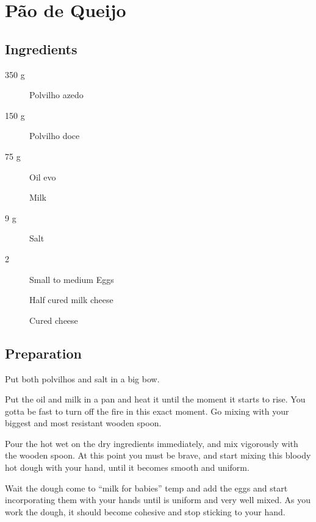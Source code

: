 \setchapterpreamble[u]{\margintoc}
\chapter{Pão de Queijo}

\section{Ingredients}

\begin{multicols}{2}
\begin{description}
	\item[350 g] Polvilho azedo
	\item[150 g] Polvilho doce
	\item[75 g] Oil \gls{evo}
	\item[] Milk
	\item[9 g] Salt
	\item[2 ] Small to medium Eggs
	\item[] Half cured milk cheese
	\item[] Cured cheese
\end{description}
\end{multicols}

\section{Preparation}
Put both polvilhos and salt in a big bow.

Put the oil and milk in a pan and heat it until the moment it starts to rise. You gotta be fast to turn off the fire in this exact moment. 
%
Go mixing with your biggest and most resistant wooden spoon.

Pour the hot wet on the dry ingredients immediately, and mix vigorously with the wooden spoon.
%
At this point you must be brave, and start mixing this bloody hot dough with your hand, until it becomes smooth and uniform.

Wait the dough come to ``milk for babies'' temp and add the eggs and start incorporating them with your hands until is uniform and very well mixed.
%
As you work the dough, it should become cohesive and stop sticking to your hand.

